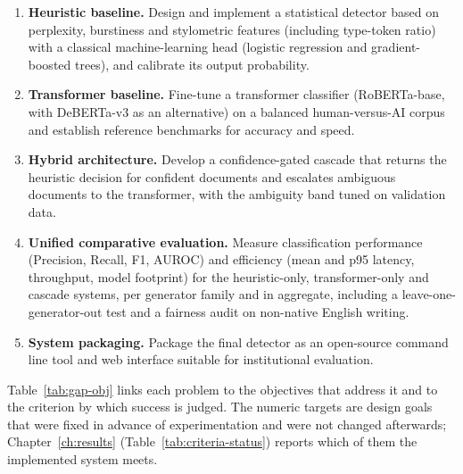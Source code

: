 \begin{enumerate}[label=\textbf{O\arabic*.},leftmargin=1.2cm,itemsep=5pt]
\item \textbf{Heuristic baseline.} Design and implement a statistical detector
      based on perplexity, burstiness and stylometric features (including
      type-token ratio) with a classical machine-learning head (logistic
      regression and gradient-boosted trees), and calibrate its output
      probability.
\item \textbf{Transformer baseline.} Fine-tune a transformer classifier
      (RoBERTa-base, with DeBERTa-v3 as an alternative) on a balanced
      human-versus-AI corpus and establish reference benchmarks for accuracy
      and speed.
\item \textbf{Hybrid architecture.} Develop a confidence-gated cascade that
      returns the heuristic decision for confident documents and escalates
      ambiguous documents to the transformer, with the ambiguity band tuned on
      validation data.
\item \textbf{Unified comparative evaluation.} Measure classification
      performance (Precision, Recall, F1, AUROC) and efficiency (mean and p95
      latency, throughput, model footprint) for the heuristic-only,
      transformer-only and cascade systems, per generator family and in
      aggregate, including a leave-one-generator-out test and a fairness audit
      on non-native English writing.
\item \textbf{System packaging.} Package the final detector as an open-source
      command line tool and web interface suitable for institutional
      evaluation.
\end{enumerate}

Table~\ref{tab:gap-obj} links each problem to the objectives that address it
and to the criterion by which success is judged. The numeric targets are
design goals that were fixed in advance of experimentation and were not
changed afterwards; Chapter~\ref{ch:results} (Table~\ref{tab:criteria-status})
reports which of them the implemented system meets.


